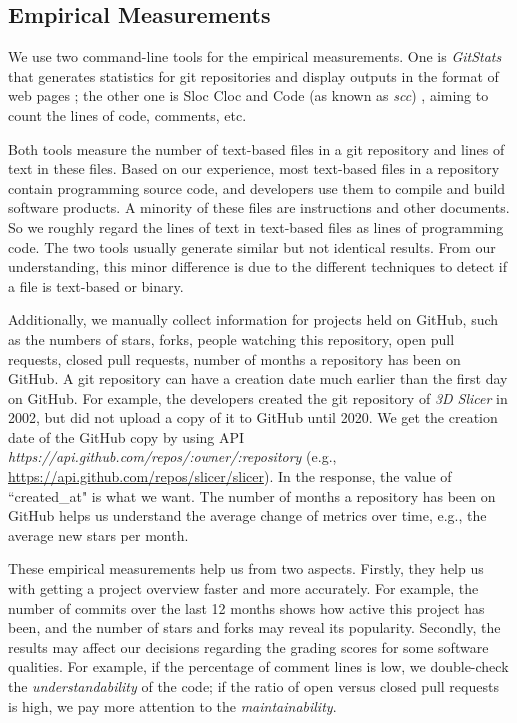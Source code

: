 \subsection{Empirical Measurements}
\label{sec_empirical_measurements}

We use two command-line tools for the empirical measurements. One is \textit{GitStats} that generates statistics for git repositories and display outputs in the format of web pages \cite{Gieniusz2019}; the other one is Sloc Cloc and Code (as known as \textit{scc}) \cite{Boyter2021}, aiming to count the lines of code, comments, etc.

Both tools measure the number of text-based files in a git repository and lines of text in these files. Based on our experience, most text-based files in a repository contain programming source code, and developers use them to compile and build software products. A minority of these files are instructions and other documents. So we roughly regard the lines of text in text-based files as lines of programming code. The two tools usually generate similar but not identical results. From our understanding, this minor difference is due to the different techniques to detect if a file is text-based or binary.

Additionally, we manually collect information for projects held on GitHub, such as the numbers of stars, forks, people watching this repository, open pull requests, closed pull requests, number of months a repository has been on GitHub. A git repository can have a creation date much earlier than the first day on GitHub. For example, the developers created the git repository of \textit{3D Slicer} in 2002, but did not upload a copy of it to GitHub until 2020. We get the creation date of the GitHub copy by using API \textit{https://api.github.com/repos/{:owner}/{:repository}} (e.g., \hyperlink{https://api.github.com/repos/slicer/slicer}{https://api.github.com/repos/slicer/slicer}). In the response, the value of ``created\_at" is what we want. The number of months a repository has been on GitHub helps us understand the average change of metrics over time, e.g., the average new stars per month. 

These empirical measurements help us from two aspects. Firstly, they help us with getting a project overview faster and more accurately. For example, the number of commits over the last 12 months shows how active this project has been, and the number of stars and forks may reveal its popularity. Secondly, the results may affect our decisions regarding the grading scores for some software qualities. For example, if the percentage of comment lines is low, we double-check the \textit{understandability} of the code; if the ratio of open versus closed pull requests is high, we pay more attention to the \textit{maintainability}.

